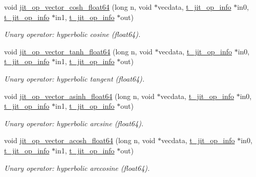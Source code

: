 \begin{DoxyCompactItemize}
void \hyperlink{group__opvecmod_ga79b3b3a9e216deb72c603c4e2212b549}{jit\_\-op\_\-vector\_\-cosh\_\-float64} (long n, void $\ast$vecdata, \hyperlink{structt__jit__op__info}{t\_\-jit\_\-op\_\-info} $\ast$in0, \hyperlink{structt__jit__op__info}{t\_\-jit\_\-op\_\-info} $\ast$in1, \hyperlink{structt__jit__op__info}{t\_\-jit\_\-op\_\-info} $\ast$out)
\begin{DoxyCompactList}\small\item\em Unary operator: hyperbolic cosine (float64). \item\end{DoxyCompactList}\item 
void \hyperlink{group__opvecmod_ga0c9a6939ee7f08cd26758a368ad36d85}{jit\_\-op\_\-vector\_\-tanh\_\-float64} (long n, void $\ast$vecdata, \hyperlink{structt__jit__op__info}{t\_\-jit\_\-op\_\-info} $\ast$in0, \hyperlink{structt__jit__op__info}{t\_\-jit\_\-op\_\-info} $\ast$in1, \hyperlink{structt__jit__op__info}{t\_\-jit\_\-op\_\-info} $\ast$out)
\begin{DoxyCompactList}\small\item\em Unary operator: hyperbolic tangent (float64). \item\end{DoxyCompactList}\item 
void \hyperlink{group__opvecmod_ga8b26e3d9b7e06608165cbadf5238df12}{jit\_\-op\_\-vector\_\-asinh\_\-float64} (long n, void $\ast$vecdata, \hyperlink{structt__jit__op__info}{t\_\-jit\_\-op\_\-info} $\ast$in0, \hyperlink{structt__jit__op__info}{t\_\-jit\_\-op\_\-info} $\ast$in1, \hyperlink{structt__jit__op__info}{t\_\-jit\_\-op\_\-info} $\ast$out)
\begin{DoxyCompactList}\small\item\em Unary operator: hyperbolic arcsine (float64). \item\end{DoxyCompactList}\item 
void \hyperlink{group__opvecmod_gad0984d6a7094705a0dc5aa10f890f8b9}{jit\_\-op\_\-vector\_\-acosh\_\-float64} (long n, void $\ast$vecdata, \hyperlink{structt__jit__op__info}{t\_\-jit\_\-op\_\-info} $\ast$in0, \hyperlink{structt__jit__op__info}{t\_\-jit\_\-op\_\-info} $\ast$in1, \hyperlink{structt__jit__op__info}{t\_\-jit\_\-op\_\-info} $\ast$out)
\begin{DoxyCompactList}\small\item\em Unary operator: hyperbolic arccosine (float64). \item\end{DoxyCompactList}\item 

\end{DoxyCompactItemize}
